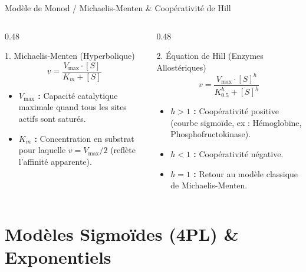 \documentclass[aspectratio=169,10pt]{beamer}
\begin{document}
\begin{frame}{Modèle de Monod / Michaelis-Menten \& Coopérativité de Hill}
  \begin{columns}[onlytextwidth, T]
    \begin{column}{0.48\linewidth}
      \begin{conceptbox}{1. Michaelis-Menten (Hyperbolique)}
        \begin{equation*}
          v = \frac{V_{\max} \cdot [S]}{K_m + [S]}
        \end{equation*}
        \begin{itemize}
          \item \textbf{$V_{\max}$ :} Capacité catalytique maximale quand tous les sites actifs sont saturés.
          \item \textbf{$K_m$ :} Concentration en substrat pour laquelle $v = V_{\max} / 2$ (reflète l'affinité apparente).
        \end{itemize}
      \end{conceptbox}
    \end{column}
    \begin{column}{0.48\linewidth}
      \begin{conceptbox}{2. Équation de Hill (Enzymes Allostériques)}
        \begin{equation*}
          v = \frac{V_{\max} \cdot [S]^h}{K_{0.5}^h + [S]^h}
        \end{equation*}
        \begin{itemize}
          \item \textbf{$h > 1$ :} Coopérativité positive (courbe sigmoïde, ex : Hémoglobine, Phosphofructokinase).
          \item \textbf{$h < 1$ :} Coopérativité négative.
          \item \textbf{$h = 1$ :} Retour au modèle classique de Michaelis-Menten.
        \end{itemize}
      \end{conceptbox}
    \end{column}
  \end{columns}
\end{frame}

\section{Modèles Sigmoïdes (4PL) \& Exponentiels}
\end{document}

